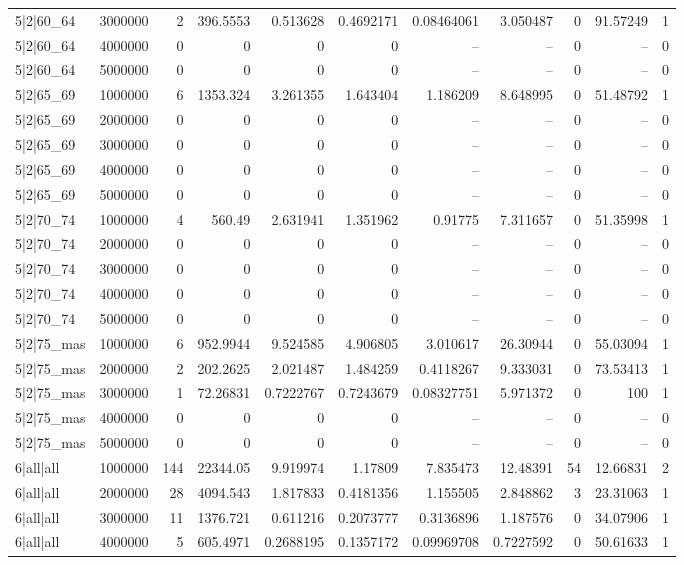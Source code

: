 \begin{tabular}{lrrrrrrrrrr}
5|2|60\_64 & 3000000 & 2 & 396.5553 & 0.513628 & 0.4692171 & 0.08464061 & 3.050487 & 0 & 91.57249 & 1 \\
5|2|60\_64 & 4000000 & 0 & 0 & 0 & 0 & -- & -- & 0 & -- & 0 \\
5|2|60\_64 & 5000000 & 0 & 0 & 0 & 0 & -- & -- & 0 & -- & 0 \\
5|2|65\_69 & 1000000 & 6 & 1353.324 & 3.261355 & 1.643404 & 1.186209 & 8.648995 & 0 & 51.48792 & 1 \\
5|2|65\_69 & 2000000 & 0 & 0 & 0 & 0 & -- & -- & 0 & -- & 0 \\
5|2|65\_69 & 3000000 & 0 & 0 & 0 & 0 & -- & -- & 0 & -- & 0 \\
5|2|65\_69 & 4000000 & 0 & 0 & 0 & 0 & -- & -- & 0 & -- & 0 \\
5|2|65\_69 & 5000000 & 0 & 0 & 0 & 0 & -- & -- & 0 & -- & 0 \\
5|2|70\_74 & 1000000 & 4 & 560.49 & 2.631941 & 1.351962 & 0.91775 & 7.311657 & 0 & 51.35998 & 1 \\
5|2|70\_74 & 2000000 & 0 & 0 & 0 & 0 & -- & -- & 0 & -- & 0 \\
5|2|70\_74 & 3000000 & 0 & 0 & 0 & 0 & -- & -- & 0 & -- & 0 \\
5|2|70\_74 & 4000000 & 0 & 0 & 0 & 0 & -- & -- & 0 & -- & 0 \\
5|2|70\_74 & 5000000 & 0 & 0 & 0 & 0 & -- & -- & 0 & -- & 0 \\
5|2|75\_mas & 1000000 & 6 & 952.9944 & 9.524585 & 4.906805 & 3.010617 & 26.30944 & 0 & 55.03094 & 1 \\
5|2|75\_mas & 2000000 & 2 & 202.2625 & 2.021487 & 1.484259 & 0.4118267 & 9.333031 & 0 & 73.53413 & 1 \\
5|2|75\_mas & 3000000 & 1 & 72.26831 & 0.7222767 & 0.7243679 & 0.08327751 & 5.971372 & 0 & 100 & 1 \\
5|2|75\_mas & 4000000 & 0 & 0 & 0 & 0 & -- & -- & 0 & -- & 0 \\
5|2|75\_mas & 5000000 & 0 & 0 & 0 & 0 & -- & -- & 0 & -- & 0 \\
6|all|all & 1000000 & 144 & 22344.05 & 9.919974 & 1.17809 & 7.835473 & 12.48391 & 54 & 12.66831 & 2 \\
6|all|all & 2000000 & 28 & 4094.543 & 1.817833 & 0.4181356 & 1.155505 & 2.848862 & 3 & 23.31063 & 1 \\
6|all|all & 3000000 & 11 & 1376.721 & 0.611216 & 0.2073777 & 0.3136896 & 1.187576 & 0 & 34.07906 & 1 \\
6|all|all & 4000000 & 5 & 605.4971 & 0.2688195 & 0.1357172 & 0.09969708 & 0.7227592 & 0 & 50.61633 & 1 \\

\end{tabular}
